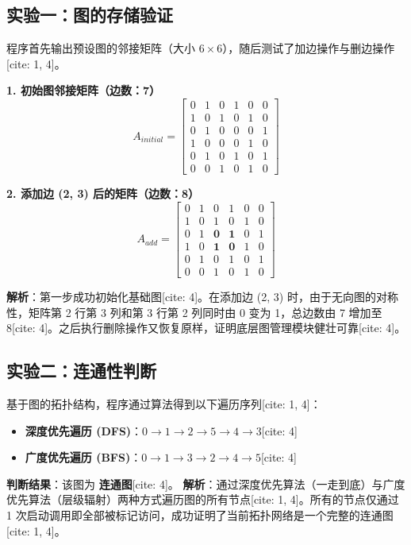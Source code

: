 \documentclass[12pt,a4paper]{article}
\begin{document}
\subsection{实验一：图的存储验证}
程序首先输出预设图的邻接矩阵（大小 $6\times 6$），随后测试了加边操作与删边操作[cite: 1, 4]。

\textbf{1. 初始图邻接矩阵（边数：7）}
\[
A_{initial} = \begin{bmatrix}
0 & 1 & 0 & 1 & 0 & 0 \\
1 & 0 & 1 & 0 & 1 & 0 \\
0 & 1 & 0 & 0 & 0 & 1 \\
1 & 0 & 0 & 0 & 1 & 0 \\
0 & 1 & 0 & 1 & 0 & 1 \\
0 & 0 & 1 & 0 & 1 & 0 
\end{bmatrix}
\]

\textbf{2. 添加边 (2, 3) 后的矩阵（边数：8）}
\[
A_{add} = \begin{bmatrix}
0 & 1 & 0 & 1 & 0 & 0 \\
1 & 0 & 1 & 0 & 1 & 0 \\
0 & 1 & \mathbf{0} & \mathbf{1} & 0 & 1 \\
1 & 0 & \mathbf{1} & \mathbf{0} & 1 & 0 \\
0 & 1 & 0 & 1 & 0 & 1 \\
0 & 0 & 1 & 0 & 1 & 0 
\end{bmatrix}
\]

\textbf{解析}：第一步成功初始化基础图[cite: 4]。在添加边 (2, 3) 时，由于无向图的对称性，矩阵第 2 行第 3 列和第 3 行第 2 列同时由 0 变为 1，总边数由 7 增加至 8[cite: 4]。之后执行删除操作又恢复原样，证明底层图管理模块健壮可靠[cite: 4]。

\subsection{实验二：连通性判断}

基于图的拓扑结构，程序通过算法得到以下遍历序列[cite: 1, 4]：
\begin{itemize}
    \item \textbf{深度优先遍历 (DFS)}：$0 \rightarrow 1 \rightarrow 2 \rightarrow 5 \rightarrow 4 \rightarrow 3$[cite: 4]
    \item \textbf{广度优先遍历 (BFS)}：$0 \rightarrow 1 \rightarrow 3 \rightarrow 2 \rightarrow 4 \rightarrow 5$[cite: 4]
\end{itemize}
\textbf{判断结果}：该图为 \textbf{连通图}[cite: 4]。
\textbf{解析}：通过深度优先算法（一走到底）与广度优先算法（层级辐射）两种方式遍历图的所有节点[cite: 1, 4]。所有的节点仅通过 1 次启动调用即全部被标记访问，成功证明了当前拓扑网络是一个完整的连通图[cite: 1, 4]。
\end{document}
